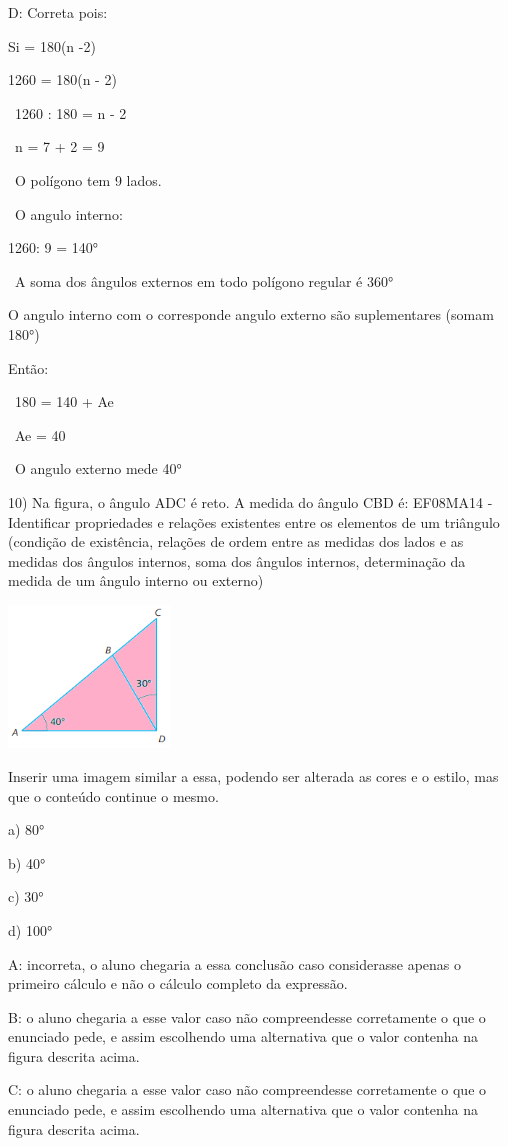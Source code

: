 D: Correta pois:

Si = 180(n -2)

1260 = 180(n - 2)

~1260 : 180 = n - 2

~n = 7 + 2 = 9

~O polígono tem 9 lados.

~O angulo interno:

1260: 9 = 140°

~A soma dos ângulos externos em todo polígono regular é 360°

O angulo interno com o corresponde angulo externo são suplementares
(somam 180°)

Então:

~180 = 140 + Ae

~Ae = 40

~O angulo externo mede 40°

10) Na figura, o ângulo ADC é reto. A medida do ângulo CBD é: EF08MA14 -
Identificar propriedades e relações existentes entre os elementos de um
triângulo (condição de existência, relações de ordem entre as medidas
dos lados e as medidas dos ângulos internos, soma dos ângulos internos,
determinação da medida de um ângulo interno ou externo)

\includegraphics[width=1.68333in,height=1.49462in]{./imgSAEB_8_MAT/media/image62.png}

Inserir uma imagem similar a essa, podendo ser alterada as cores e o
estilo, mas que o conteúdo continue o mesmo.

a) 80°

b) 40°

c) 30°

d) 100°

A: incorreta, o aluno chegaria a essa conclusão caso considerasse apenas
o primeiro cálculo e não o cálculo completo da expressão.

B: o aluno chegaria a esse valor caso não compreendesse corretamente o
que o enunciado pede, e assim escolhendo uma alternativa que o valor
contenha na figura descrita acima.

C: o aluno chegaria a esse valor caso não compreendesse corretamente o
que o enunciado pede, e assim escolhendo uma alternativa que o valor
contenha na figura descrita acima.

